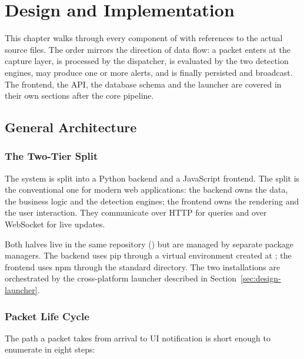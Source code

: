 \chapter{Design and Implementation}
\label{chap:design}

This chapter walks through every component of \nidsname{} with
references to the actual source files. The order mirrors the
direction of data flow: a packet enters at the capture layer, is
processed by the dispatcher, is evaluated by the two detection
engines, may produce one or more alerts, and is finally persisted
and broadcast. The frontend, the API, the database schema and the
launcher are covered in their own sections after the core pipeline.

\section{General Architecture}
\label{sec:design-architecture}

\subsection{The Two-Tier Split}
\label{sec:design-tiers}

The system is split into a Python backend and a JavaScript
frontend. The split is the conventional one for modern web
applications: the backend owns the data, the business logic and the
detection engines; the frontend owns the rendering and the user
interaction. They communicate over HTTP for queries and over
WebSocket for live updates.

Both halves live in the same repository () but
are managed by separate package managers. The backend uses pip
through a virtual environment created at
; the frontend uses npm through the standard
 directory. The two installations are
orchestrated by the cross-platform launcher described in
Section~\ref{sec:design-launcher}.

\subsection{Packet Life Cycle}
\label{sec:design-lifecycle}

The path a packet takes from arrival to UI notification is short
enough to enumerate in eight steps:

